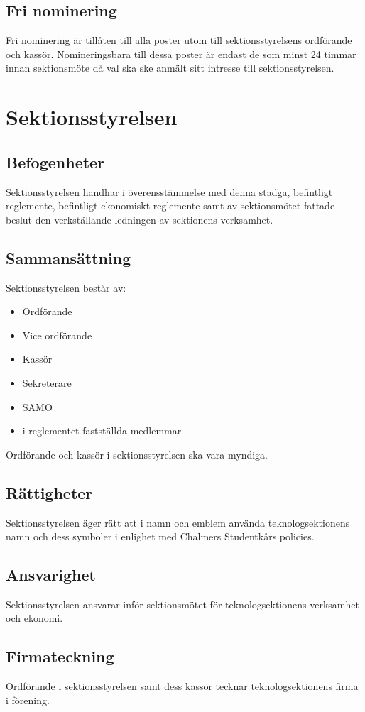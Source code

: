 \documentclass[a4paper]{dtek}
\begin{document}
\subsection{Fri nominering}
Fri nominering är tillåten till alla poster utom till sektionsstyrelsens ordförande och kassör. Nomineringsbara till dessa poster är endast de som minst 24 timmar innan sektionsmöte då val ska ske anmält sitt intresse till sektionsstyrelsen.
\newpage

\section{Sektionsstyrelsen}
\subsection{Befogenheter}
Sektionsstyrelsen handhar i överensstämmelse med denna stadga, befintligt reglemente, befintligt ekonomiskt reglemente samt av sektionsmötet fattade beslut den verkställande ledningen av sektionens verksamhet.
\subsection{Sammansättning}
Sektionsstyrelsen består av:
\begin{itemize}
\item Ordförande
\item Vice ordförande
\item Kassör
\item Sekreterare
\item SAMO
\item i reglementet fastställda medlemmar
\end{itemize}
Ordförande och kassör i sektionsstyrelsen ska vara myndiga.
\subsection{Rättigheter}
Sektionsstyrelsen äger rätt att i namn och emblem använda teknologsektionens namn och dess symboler i enlighet med Chalmers Studentkårs policies.
\subsection{Ansvarighet}
Sektionsstyrelsen ansvarar inför sektionsmötet för teknologsektionens verksamhet och ekonomi.
\subsection{Firmateckning}
Ordförande i sektionsstyrelsen samt dess kassör tecknar teknologsektionens firma i förening. %
\end{document}
